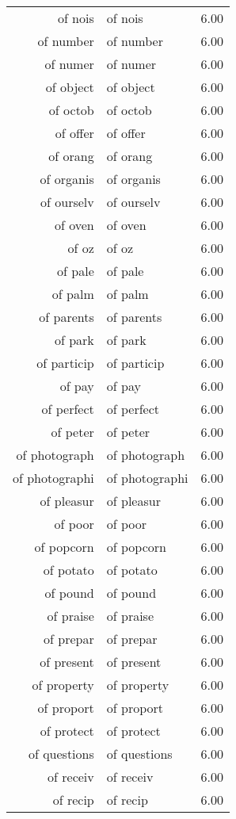 \begin{table}[ht]
\begin{tabular}{rlr}
  of nois & of nois & 6.00 \\ 
  of number & of number & 6.00 \\ 
  of numer & of numer & 6.00 \\ 
  of object & of object & 6.00 \\ 
  of octob & of octob & 6.00 \\ 
  of offer & of offer & 6.00 \\ 
  of orang & of orang & 6.00 \\ 
  of organis & of organis & 6.00 \\ 
  of ourselv & of ourselv & 6.00 \\ 
  of oven & of oven & 6.00 \\ 
  of oz & of oz & 6.00 \\ 
  of pale & of pale & 6.00 \\ 
  of palm & of palm & 6.00 \\ 
  of parents & of parents & 6.00 \\ 
  of park & of park & 6.00 \\ 
  of particip & of particip & 6.00 \\ 
  of pay & of pay & 6.00 \\ 
  of perfect & of perfect & 6.00 \\ 
  of peter & of peter & 6.00 \\ 
  of photograph & of photograph & 6.00 \\ 
  of photographi & of photographi & 6.00 \\ 
  of pleasur & of pleasur & 6.00 \\ 
  of poor & of poor & 6.00 \\ 
  of popcorn & of popcorn & 6.00 \\ 
  of potato & of potato & 6.00 \\ 
  of pound & of pound & 6.00 \\ 
  of praise & of praise & 6.00 \\ 
  of prepar & of prepar & 6.00 \\ 
  of present & of present & 6.00 \\ 
  of property & of property & 6.00 \\ 
  of proport & of proport & 6.00 \\ 
  of protect & of protect & 6.00 \\ 
  of questions & of questions & 6.00 \\ 
  of receiv & of receiv & 6.00 \\ 
  of recip & of recip & 6.00 \\ 

\end{tabular}
\end{table}

